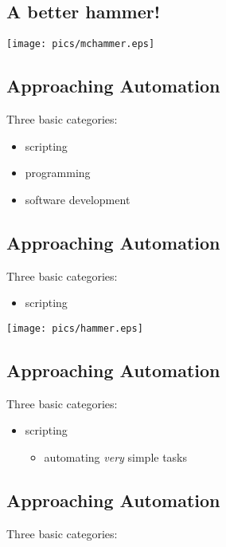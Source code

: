 \documentclass[xga]{xdvislides}
\begin{document}
\subsection{A better hammer!}
\vspace*{\fill}
\begin{center}
	\texttt{[image: pics/mchammer.eps]}
\end{center}
\vspace*{\fill}


\subsection{Approaching Automation}
Three basic categories:
\\

\begin{itemize}
	\item scripting
	\item programming
	\item software development
\end{itemize}

\subsection{Approaching Automation}
Three basic categories:
\\
\begin{itemize}
	\item scripting
\end{itemize}
\vspace*{\fill}
\begin{center}
	\texttt{[image: pics/hammer.eps]}
\end{center}
\vspace*{\fill}


\subsection{Approaching Automation}
Three basic categories:
\\

\begin{itemize}
	\item scripting
		\begin{itemize}
			\item automating {\em very} simple tasks
		\end{itemize}
\end{itemize}

\subsection{Approaching Automation}
Three basic categories:
\\
\end{document}
